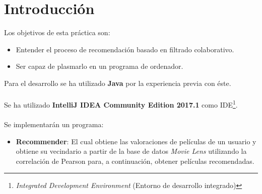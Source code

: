	
	
	
\setcounter{page}{0}

\maketitle %
\thispagestyle{empty}

\newpage %

\tableofcontents %

\newpage %



\newpage


\section{Introducción}
\label{sec:intro}

Los objetivos de esta práctica son:

\begin{itemize}
	\item Entender el proceso de recomendación basado en filtrado colaborativo.
	\item Ser capaz de plasmarlo en un programa de ordenador.
\end{itemize}

Para el desarrollo se ha utilizado \textbf{Java} por la experiencia previa con éste.
\\ \\
Se ha utilizado \textbf{IntelliJ IDEA Community Edition 2017.1} como IDE\footnote{\textit{Integrated Development Environment} (Entorno de desarrollo integrado)}.
\\ \\
Se implementarán un programa:

\begin{itemize}
	\item \textbf{Recommender}: El cual obtiene las valoraciones de películas de un usuario y obtiene su vecindario a partir de la base de datos \textit{Movie Lens} utilizando la correlación de Pearson para, a continuación, obtener películas recomendadas.
\end{itemize}

